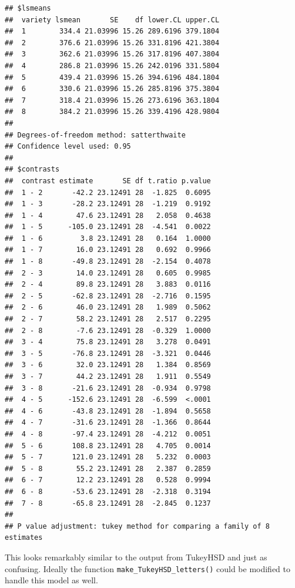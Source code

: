 \documentclass[]{book}
\theoremstyle{definition}
\theoremstyle{definition}
\theoremstyle{remark}
\begin{document}
\begin{verbatim}
## $lsmeans
##  variety lsmean       SE    df lower.CL upper.CL
##  1        334.4 21.03996 15.26 289.6196 379.1804
##  2        376.6 21.03996 15.26 331.8196 421.3804
##  3        362.6 21.03996 15.26 317.8196 407.3804
##  4        286.8 21.03996 15.26 242.0196 331.5804
##  5        439.4 21.03996 15.26 394.6196 484.1804
##  6        330.6 21.03996 15.26 285.8196 375.3804
##  7        318.4 21.03996 15.26 273.6196 363.1804
##  8        384.2 21.03996 15.26 339.4196 428.9804
## 
## Degrees-of-freedom method: satterthwaite 
## Confidence level used: 0.95 
## 
## $contrasts
##  contrast estimate       SE df t.ratio p.value
##  1 - 2       -42.2 23.12491 28  -1.825  0.6095
##  1 - 3       -28.2 23.12491 28  -1.219  0.9192
##  1 - 4        47.6 23.12491 28   2.058  0.4638
##  1 - 5      -105.0 23.12491 28  -4.541  0.0022
##  1 - 6         3.8 23.12491 28   0.164  1.0000
##  1 - 7        16.0 23.12491 28   0.692  0.9966
##  1 - 8       -49.8 23.12491 28  -2.154  0.4078
##  2 - 3        14.0 23.12491 28   0.605  0.9985
##  2 - 4        89.8 23.12491 28   3.883  0.0116
##  2 - 5       -62.8 23.12491 28  -2.716  0.1595
##  2 - 6        46.0 23.12491 28   1.989  0.5062
##  2 - 7        58.2 23.12491 28   2.517  0.2295
##  2 - 8        -7.6 23.12491 28  -0.329  1.0000
##  3 - 4        75.8 23.12491 28   3.278  0.0491
##  3 - 5       -76.8 23.12491 28  -3.321  0.0446
##  3 - 6        32.0 23.12491 28   1.384  0.8569
##  3 - 7        44.2 23.12491 28   1.911  0.5549
##  3 - 8       -21.6 23.12491 28  -0.934  0.9798
##  4 - 5      -152.6 23.12491 28  -6.599  <.0001
##  4 - 6       -43.8 23.12491 28  -1.894  0.5658
##  4 - 7       -31.6 23.12491 28  -1.366  0.8644
##  4 - 8       -97.4 23.12491 28  -4.212  0.0051
##  5 - 6       108.8 23.12491 28   4.705  0.0014
##  5 - 7       121.0 23.12491 28   5.232  0.0003
##  5 - 8        55.2 23.12491 28   2.387  0.2859
##  6 - 7        12.2 23.12491 28   0.528  0.9994
##  6 - 8       -53.6 23.12491 28  -2.318  0.3194
##  7 - 8       -65.8 23.12491 28  -2.845  0.1237
## 
## P value adjustment: tukey method for comparing a family of 8 estimates
\end{verbatim}

This looks remarkably similar to the output from TukeyHSD and just as
confusing. Ideally the function \texttt{make\_TukeyHSD\_letters()} could
be modified to handle this model as well.
\end{document}
